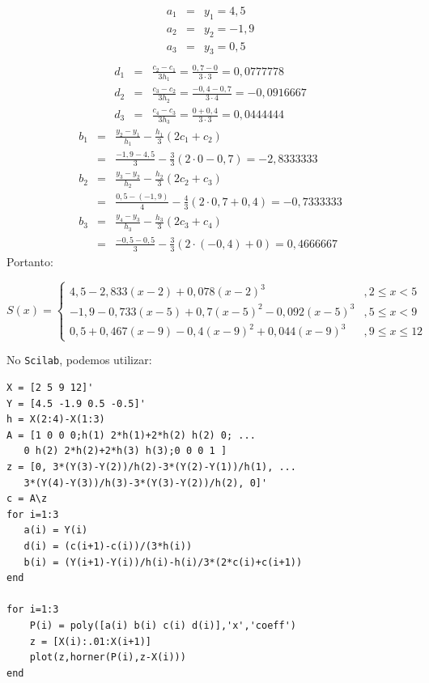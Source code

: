 \begin{sol}
\begin{eqnarray*}
a_1&=&y_1=4,5\\
a_2&=&y_2=-1,9\\
a_3&=&y_3=0,5\\
\end{eqnarray*}
\begin{eqnarray*}
d_1&=&\frac{c_{2}-c_1}{3h_1}=\frac{0,7-0}{3\cdot 3}=0,0777778\\
d_2&=&\frac{c_{3}-c_2}{3h_2}=\frac{-0,4-0,7}{3\cdot 4}=-0,0916667\\
d_3&=&\frac{c_{4}-c_3}{3h_3}=\frac{0+0,4}{3\cdot 3}=0,0444444
\end{eqnarray*}
\begin{eqnarray*}
b_1 &=& \frac{y_{2}-y_1}{h_1}-\frac{h_1}{3}(2c_1+c_{2})\\
&=& \frac{-1,9-4,5}{3}-\frac{3}{3}(2\cdot 0-0,7)=-2,8333333\\
b_2&=& \frac{y_{3}-y_2}{h_2}-\frac{h_2}{3}(2c_2+c_{3})\\
&=& \frac{0,5-(-1,9)}{4}-\frac{4}{3}(2\cdot 0,7+0,4)=-0,7333333\\
b_3&=& \frac{y_{4}-y_3}{h_3}-\frac{h_3}{3}(2c_3+c_{4})\\
&=& \frac{-0,5-0,5}{3}-\frac{3}{3}(2\cdot (-0,4)+0)=0,4666667
\end{eqnarray*}
Portanto:
\begin{small}
\begin{equation*}
S(x)=\left\{\begin{array}{ll}
4,5-2,833(x-2)+0,078(x-2)^3 &\!, 2\leq x<5\\
-1,9-0,733(x-5)+0,7(x-5)^2-0,092(x-5)^3 &\!, 5\leq x<9\\
0,5+0,467(x-9)-0,4(x-9)^2+0,044(x-9)^3 &\!, 9\leq x\leq 12
\end{array}\right.
\end{equation*}  
\end{small}

\ifisscilab
No \verb+Scilab+, podemos utilizar:
\begin{verbatim}
X = [2 5 9 12]'
Y = [4.5 -1.9 0.5 -0.5]'
h = X(2:4)-X(1:3)
A = [1 0 0 0;h(1) 2*h(1)+2*h(2) h(2) 0; ...
   0 h(2) 2*h(2)+2*h(3) h(3);0 0 0 1 ]
z = [0, 3*(Y(3)-Y(2))/h(2)-3*(Y(2)-Y(1))/h(1), ...
   3*(Y(4)-Y(3))/h(3)-3*(Y(3)-Y(2))/h(2), 0]'
c = A\z
for i=1:3
   a(i) = Y(i)
   d(i) = (c(i+1)-c(i))/(3*h(i))
   b(i) = (Y(i+1)-Y(i))/h(i)-h(i)/3*(2*c(i)+c(i+1))
end

for i=1:3
    P(i) = poly([a(i) b(i) c(i) d(i)],'x','coeff')
    z = [X(i):.01:X(i+1)]
    plot(z,horner(P(i),z-X(i)))
end
\end{verbatim}
\fi
\end{sol}

